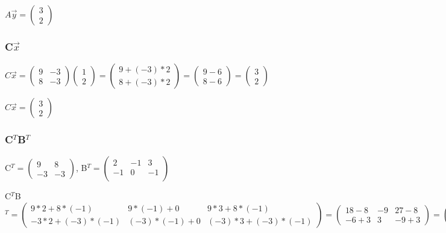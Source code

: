 \documentclass{article}
\begin{document}
$A\vec{y}=
\left (
    \begin{matrix}
        3\\
        2
    \end{matrix}
\right )
$

\subsubsection*{C$\vec{x}$}
$C\vec{x} =
\left (
    \begin{matrix}
        9 & -3\\
        8 & -3
    \end{matrix}
\right )
\left (
    \begin{matrix}
        1\\
        2
    \end{matrix}
\right )
=
\left (
    \begin{matrix}
        9 + (-3)*2\\
        8 + (-3)*2
    \end{matrix}
\right )
=
\left (
    \begin{matrix}
        9 - 6\\
        8 - 6
    \end{matrix}
\right )
=
\left (
    \begin{matrix}
        3\\
        2
    \end{matrix}
\right )
$

$C\vec{x}=
\left (
    \begin{matrix}
        3\\
        2
    \end{matrix}
\right )
$

\subsubsection*{C$^{T}$B$^{T}$}
C$^{T}=
\left (
    \begin{matrix}
        9 & 8\\
        -3 & -3
    \end{matrix}
\right )
$,
B$^{T}=
\left (
    \begin{matrix}
        2 & -1 & 3\\
        -1 & 0 & -1\\
    \end{matrix}
\right )
$

C$^{T}$B$^{T}=
\left (
    \begin{matrix}
       9*2 + 8*(-1) & 9*(-1) + 0 & 9*3 + 8*(-1)\\
       -3*2 + (-3)*(-1) & (-3)*(-1) + 0 & (-3)*3 + (-3)*(-1)
    \end{matrix}
\right )
=
\left (
    \begin{matrix}
        18-8 & -9 & 27-8\\
        -6+3 & 3 & -9+3
    \end{matrix}
\right )
=
\left (
    \begin{matrix}
        10 & -9 & 19\\
        -3 & 3 & -6
    \end{matrix}
\right )
$
\end{document}
